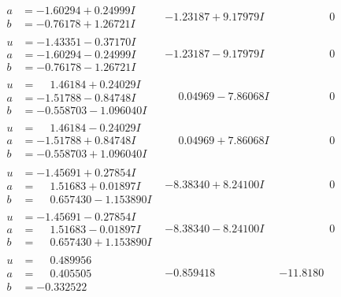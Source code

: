 \documentclass[1p]{elsarticle_modified}
\theoremstyle{definition}
\begin{document}
$$\begin{array}{c|c|c}
\begin{aligned}
a &= -1.60294 + 0.24999 I \\
b &= -0.76178 + 1.26721 I\end{aligned}
 & -1.23187 + 9.17979 I & \phantom{-0.000000 } 0 \\ \hline\begin{aligned}
u &= -1.43351 - 0.37170 I \\
a &= -1.60294 - 0.24999 I \\
b &= -0.76178 - 1.26721 I\end{aligned}
 & -1.23187 - 9.17979 I & \phantom{-0.000000 } 0 \\ \hline\begin{aligned}
u &= \phantom{-}1.46184 + 0.24029 I \\
a &= -1.51788 - 0.84748 I \\
b &= -0.558703 - 1.096040 I\end{aligned}
 & \phantom{-}0.04969 - 7.86068 I & \phantom{-0.000000 } 0 \\ \hline\begin{aligned}
u &= \phantom{-}1.46184 - 0.24029 I \\
a &= -1.51788 + 0.84748 I \\
b &= -0.558703 + 1.096040 I\end{aligned}
 & \phantom{-}0.04969 + 7.86068 I & \phantom{-0.000000 } 0 \\ \hline\begin{aligned}
u &= -1.45691 + 0.27854 I \\
a &= \phantom{-}1.51683 + 0.01897 I \\
b &= \phantom{-}0.657430 - 1.153890 I\end{aligned}
 & -8.38340 + 8.24100 I & \phantom{-0.000000 } 0 \\ \hline\begin{aligned}
u &= -1.45691 - 0.27854 I \\
a &= \phantom{-}1.51683 - 0.01897 I \\
b &= \phantom{-}0.657430 + 1.153890 I\end{aligned}
 & -8.38340 - 8.24100 I & \phantom{-0.000000 } 0 \\ \hline\begin{aligned}
u &= \phantom{-}0.489956\phantom{ +0.000000I} \\
a &= \phantom{-}0.405505\phantom{ +0.000000I} \\
b &= -0.332522\phantom{ +0.000000I}\end{aligned}
 & -0.859418\phantom{ +0.000000I} & -11.8180\phantom{ +0.000000I}\\

\end{array}$$
\end{document}
